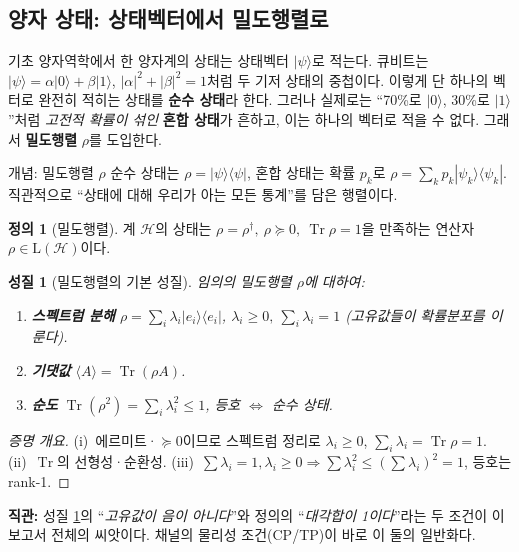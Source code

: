 \documentclass[11pt,a4paper]{article}
\newcommand{\Hcal}{\mathcal{H}}
\newcommand{\Tr}{\operatorname{Tr}}
\newcommand{\Lin}{\mathrm{L}}
\theoremstyle{definition}
\newtheorem{definition}{정의}[section]
\theoremstyle{plain}
\newtheorem{property}{성질}[section]
\theoremstyle{remark}
\begin{document}
\subsection{양자 상태: 상태벡터에서 밀도행렬로}

기초 양자역학에서 한 양자계의 상태는 상태벡터 $|\psi\rangle$로 적는다. 큐비트는 $|\psi\rangle=\alpha|0\rangle+\beta|1\rangle$, $|\alpha|^2+|\beta|^2=1$처럼 두 기저 상태의 중첩이다. 이렇게 단 하나의 벡터로 완전히 적히는 상태를 \textbf{순수 상태}라 한다. 그러나 실제로는 ``70\%로 $|0\rangle$, 30\%로 $|1\rangle$''처럼 \emph{고전적 확률이 섞인} \textbf{혼합 상태}가 흔하고, 이는 하나의 벡터로 적을 수 없다. 그래서 \textbf{밀도행렬} $\rho$를 도입한다.

\begin{conceptbox}{개념: 밀도행렬 $\rho$}
순수 상태는 $\rho=|\psi\rangle\langle\psi|$, 혼합 상태는 확률 $p_k$로 $\rho=\sum_k p_k|\psi_k\rangle\langle\psi_k|$. 직관적으로 ``상태에 대해 우리가 아는 모든 통계''를 담은 행렬이다.
\end{conceptbox}

\begin{definition}[밀도행렬]
계 $\Hcal$의 상태는 $\rho=\rho^\dagger,\ \rho\succeq0,\ \Tr\rho=1$을 만족하는 연산자 $\rho\in\Lin(\Hcal)$이다.
\end{definition}

\begin{property}[밀도행렬의 기본 성질]\label{prop:density}
임의의 밀도행렬 $\rho$에 대하여:
\begin{enumerate}[label=\textup{(\roman*)}]
  \item \textbf{스펙트럼 분해} $\rho=\sum_i\lambda_i|e_i\rangle\langle e_i|$, $\lambda_i\ge0,\ \sum_i\lambda_i=1$ (고유값들이 확률분포를 이룬다).
  \item \textbf{기댓값} $\langle A\rangle=\Tr(\rho A)$.
  \item \textbf{순도} $\Tr(\rho^2)=\sum_i\lambda_i^2\le1$, 등호 $\iff$ 순수 상태.
\end{enumerate}
\end{property}
\begin{proof}[증명 개요]
(i)~에르미트·$\succeq0$이므로 스펙트럼 정리로 $\lambda_i\ge0$, $\sum_i\lambda_i=\Tr\rho=1$. (ii)~$\Tr$의 선형성·순환성. (iii)~$\sum\lambda_i=1,\lambda_i\ge0\Rightarrow\sum\lambda_i^2\le(\sum\lambda_i)^2=1$, 등호는 rank-1.
\end{proof}

\begin{intuitionbox}
\textbf{직관:} 성질 \ref{prop:density}의 ``\emph{고유값이 음이 아니다}''와 정의의 ``\emph{대각합이 1이다}''라는 두 조건이 이 보고서 전체의 씨앗이다. 채널의 물리성 조건(CP/TP)이 바로 이 둘의 일반화다.
\end{intuitionbox}
\end{document}
